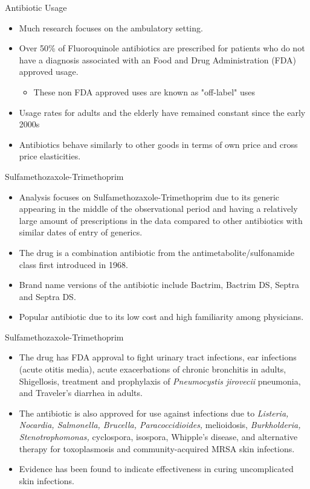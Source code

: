 \documentclass{beamer}
\begin{document}
\begin{frame}{Antibiotic Usage}
\begin{itemize}
\item Much research focuses on the ambulatory setting.
\item Over 50\% of Fluoroquinole antibiotics are prescribed for patients who do not have a diagnosis associated with an Food and Drug Administration (FDA) approved usage. 
\begin{itemize}
  \item These non FDA approved uses are known as "off-label" uses
\end{itemize}
\item Usage rates for adults and the elderly have remained constant since the early 2000s
\item Antibiotics behave similarly to other goods in terms of own price and cross price elasticities.
\end{itemize}
\end{frame}

\begin{frame}{Sulfamethozaxole-Trimethoprim}
\begin{itemize}
\item Analysis focuses on Sulfamethozaxole-Trimethoprim due to its generic appearing in the middle of the observational period and having a relatively large amount of prescriptions in the data compared to other antibiotics with similar dates of entry of generics.
\item The drug is a combination antibiotic from the antimetabolite/sulfonamide class first introduced in 1968.
\item Brand name versions of the antibiotic include Bactrim, Bactrim DS, Septra and Septra DS.
\item Popular antibiotic due to its low cost and high familiarity among physicians.
\end{itemize}
\end{frame}

\begin{frame}{Sulfamethozaxole-Trimethoprim}
\begin{itemize}
\item The drug has FDA approval to fight urinary tract infections, ear infections (acute otitis media), acute exacerbations of chronic bronchitis in adults, Shigellosis, treatment and prophylaxis of \textit{Pneumocystis jirovecii} pneumonia, and Traveler's diarrhea in adults.
\item The antibiotic is also approved for use against infections due to \textit{Listeria, Nocardia, Salmonella, Brucella, Paracoccidioides,} melioidosis, \textit{Burkholderia, Stenotrophomonas,} cyclospora, isospora, Whipple's disease, and alternative therapy for toxoplasmosis and community-acquired MRSA skin infections.
\item Evidence has been found to indicate effectiveness in curing uncomplicated skin infections.
\end{itemize}
\end{frame}
\end{document}
